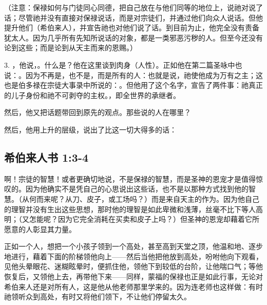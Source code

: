 （注意：保禄如何与门徒同心同德，把自己放在与他们同等的地位上，说祂对说了话；尽管祂并没有直接对保禄说话，而是对宗徒们，并通过他们向众人说话。但他提升他们（希伯来人），并宣告祂也对他们说了话。到目前为止，他完全没有责备犹太人。因为几乎所有先知所说话的对象，都是一类邪恶污秽的人。但至今还没有论到这些；而是论到从天主而来的恩赐。）\par

3. ，他说，。什么是？他在这里谈到肉身（人性）。正如他在第二篇圣咏中也说：。因为不再是，也不是，而是所有的人：也就是说，祂使他成为万有之主；这也是伯多禄在宗徒大事录中所说的：。但他用了这个名字，宣告了两件事：祂真正的儿子身份和祂不可剥夺的主权。，即全世界的承继者。\par

然后，他又把话题带回到原先的观点。那些说的人在哪里？\par

然后，他用上升的层级，说出了比这一切大得多的话：\par


\subsection{希伯来人书 1:3-4}

\par

啊！宗徒的智慧！或者更确切地说，不是保禄的智慧，而是圣神的恩宠才是值得惊叹的。因为他确实不是凭自己的心思说出这些话，也不是以那种方式找到他的智慧。（从何而来呢？从刀、皮子，或工场吗？）而是来自天主的作为。因为他自己的理智并没有生出这些思想，那时他的理智是如此卑微和浅薄，丝毫不比下等人高明；（又怎能呢？因为它完全消耗在买卖和皮子上吗？）但圣神的恩宠却藉着它所愿意的人彰显其力量。\par

正如一个人，想把一个小孩子领到一个高处，甚至高到天堂之顶，他温和地、逐步地进行，藉着下面的阶梯领他向上——然后当他把他放到高处，吩咐他向下观看，见他头晕眼花、迷糊眩晕时，便抓住他，领他下到较低的台阶，让他喘口气；等他恢复后，又领他上去，再带他下来——同样，蒙福的保禄也正是如此行事，无论对希伯来人还是对所有人，这是他从他老师那里学来的。因为连老师也这样做：有时祂领听众到高处，有时又将他们领下，不让他们停留太久。\par

